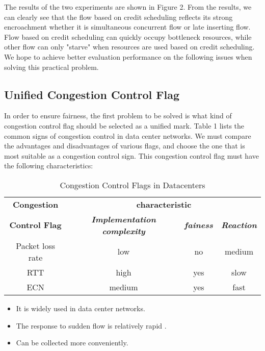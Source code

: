 \documentclass[conference]{IEEEtran}
\begin{document}
\indent The results of the two experiments are shown in Figure 2. From the results, we can clearly see that the flow based on credit scheduling reflects its strong encroachment whether it is simultaneous concurrent flow or late inserting flow. Flow based on credit scheduling can quickly occupy bottleneck resources, while other flow can only "starve" when resources are used based on credit scheduling. We hope to achieve better evaluation performance on the following issues when solving this practical problem.

\subsection{Unified Congestion Control Flag}



In order to ensure fairness, the first problem to be solved is what kind of congestion control flag should be selected as a unified mark. Table 1 lists the common signs of congestion control in data center networks. We must compare the advantages and disadvantages of various flags, and choose the one that is most suitable as a congestion control sign. This congestion control flag must have the following characteristics:
\begin{table}[!t]
\caption{Congestion Control Flags in Datacenters }
\begin{center}
\begin{tabular}{|c|c|c|c|}
\hline
\textbf{Congestion }&\multicolumn{3}{|c|}{\textbf{characteristic}} \\
\cline{2-4}
\textbf{Control Flag} & \textbf{\textit{Implementation complexity}}& \textbf{\textit{ fainess}} & \textbf{\textit{Reaction}}\\
\hline
Packet loss rate& low & no& medium \\
\hline
RTT& high&  yes& slow \\
\hline
ECN& medium&  yes& fast \\
\hline
\end{tabular}
\label{tab1}
\end{center}
\end{table}

\begin{itemize}

\item It is widely used in data center networks.

\item The response to sudden flow is relatively rapid .

\item Can be collected more conveniently.

\end{itemize}
\end{document}
